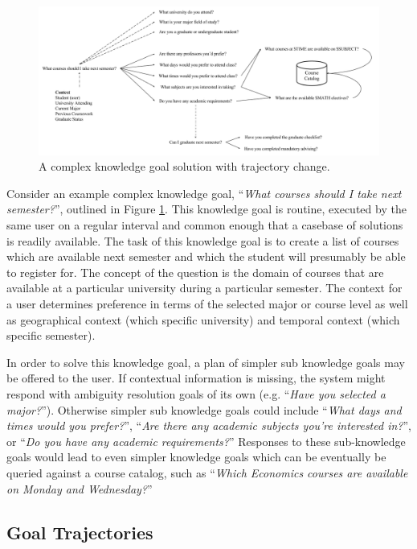 \documentclass[11pt,letterpaper]{article}
\begin{document}
\begin{figure}
	\centering
	    \includegraphics[width=\textwidth]{figures/simple_trajectory.png}
    \caption{\label{fig:simple_trajectory.png}A complex knowledge goal solution with trajectory change.}
\end{figure}

Consider an example complex knowledge goal, ``\textit{What courses should I take next semester?}'', outlined in Figure \ref{fig:simple_trajectory.png}. This knowledge goal is routine, executed by the same user on a regular interval and common enough that a casebase of solutions is readily available. The task of this knowledge goal is to create a list of courses which are available next semester and which the student will presumably be able to register for. The concept of the question is the domain of courses that are available at a particular university during a particular semester. The context for a user determines preference in terms of the selected major or course level as well as geographical context (which specific university) and temporal context (which specific semester).

In order to solve this knowledge goal, a plan of simpler sub knowledge goals may be offered to the user. If contextual information is missing, the system might respond with ambiguity resolution goals of its own (e.g. ``\textit{Have you selected a major?}''). Otherwise simpler sub knowledge goals could include ``\textit{What days and times would you prefer?}'', ``\textit{Are there any academic subjects you're interested in?}'', or ``\textit{Do you have any academic requirements?}'' Responses to these sub-knowledge goals would lead to even simpler knowledge goals which can be eventually be queried against a course catalog, such as ``\textit{Which Economics courses are available on Monday and Wednesday?}''

\subsection{Goal Trajectories}
\end{document}
